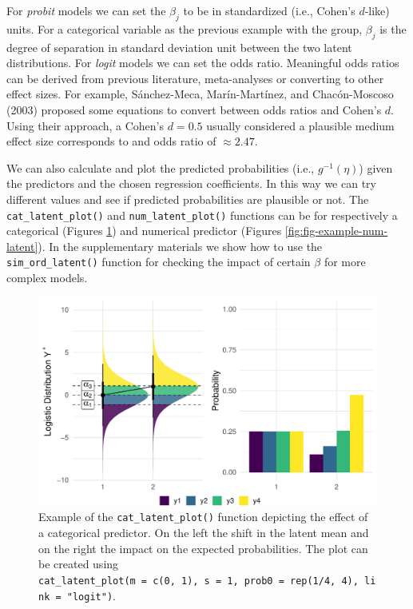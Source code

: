 \documentclass[
  man,floatsintext]{apa6}
\begin{document}
For \emph{probit} models we can set the \(\beta_j\) to be in standardized (i.e., Cohen's \(d\)-like) units. For a categorical variable as the previous example with the group, \(\beta_j\) is the degree of separation in standard deviation unit between the two latent distributions. For \emph{logit} models we can set the odds ratio. Meaningful odds ratios can be derived from previous literature, meta-analyses or converting to other effect sizes. For example, Sánchez-Meca, Marín-Martínez, and Chacón-Moscoso (2003) proposed some equations to convert between odds ratios and Cohen's \(d\). Using their approach, a Cohen's \(d = 0.5\) usually considered a plausible medium effect size corresponds to and odds ratio of \(\approx 2.47\).

We can also calculate and plot the predicted probabilities (i.e., \(g^{-1}(\eta)\)) given the predictors and the chosen regression coefficients. In this way we can try different values and see if predicted probabilities are plausible or not. The \texttt{cat\_latent\_plot()} and \texttt{num\_latent\_plot()} functions can be for respectively a categorical (Figures \ref{fig:fig-example-cat-latent}) and numerical predictor (Figures \ref{fig:fig-example-num-latent}). In the supplementary materials we show how to use the \texttt{sim\_ord\_latent()} function for checking the impact of certain \(\beta\) for more complex models.

\scriptsize

\begin{figure}

{\centering \includegraphics[width=1\linewidth]{paper_files/figure-latex/fig-example-cat-latent-1} 

}

\caption{Example of the \texttt{cat\_latent\_plot()} function depicting the effect of a categorical predictor. On the left the shift in the latent mean and on the right the impact on the expected probabilities. The plot can be created using \texttt{cat\_latent\_plot(m\ =\ c(0,\ 1),\ s\ =\ 1,\ prob0\ =\ rep(1/4,\ 4),\ link\ =\ "logit")}.}\label{fig:fig-example-cat-latent}
\end{figure}
\end{document}
